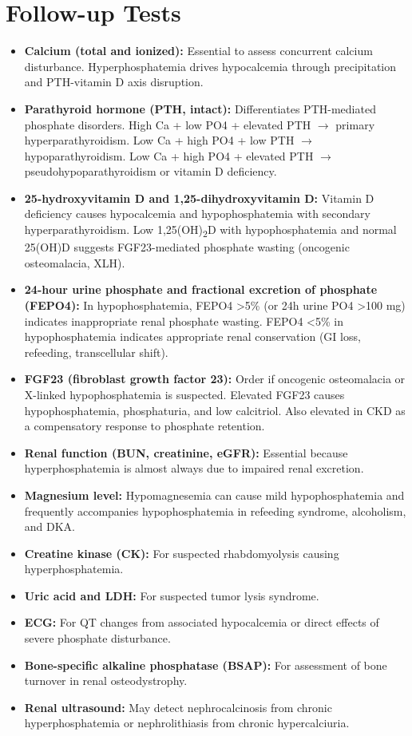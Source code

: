 \section*{Follow-up Tests}
\begin{itemize}
  \item \textbf{Calcium (total and ionized):} Essential to assess concurrent calcium disturbance. Hyperphosphatemia drives hypocalcemia through precipitation and PTH-vitamin D axis disruption.
  \item \textbf{Parathyroid hormone (PTH, intact):} Differentiates PTH-mediated phosphate disorders. High Ca + low PO4 + elevated PTH $\rightarrow$ primary hyperparathyroidism. Low Ca + high PO4 + low PTH $\rightarrow$ hypoparathyroidism. Low Ca + high PO4 + elevated PTH $\rightarrow$ pseudohypoparathyroidism or vitamin D deficiency.
  \item \textbf{25-hydroxyvitamin D and 1,25-dihydroxyvitamin D:} Vitamin D deficiency causes hypocalcemia and hypophosphatemia with secondary hyperparathyroidism. Low 1,25(OH)\textsubscript{2}D with hypophosphatemia and normal 25(OH)D suggests FGF23-mediated phosphate wasting (oncogenic osteomalacia, XLH).
  \item \textbf{24-hour urine phosphate and fractional excretion of phosphate (FEPO4):} In hypophosphatemia, FEPO4 >5\% (or 24h urine PO4 >100 mg) indicates inappropriate renal phosphate wasting. FEPO4 <5\% in hypophosphatemia indicates appropriate renal conservation (GI loss, refeeding, transcellular shift).
  \item \textbf{FGF23 (fibroblast growth factor 23):} Order if oncogenic osteomalacia or X-linked hypophosphatemia is suspected. Elevated FGF23 causes hypophosphatemia, phosphaturia, and low calcitriol. Also elevated in CKD as a compensatory response to phosphate retention.
  \item \textbf{Renal function (BUN, creatinine, eGFR):} Essential because hyperphosphatemia is almost always due to impaired renal excretion.
  \item \textbf{Magnesium level:} Hypomagnesemia can cause mild hypophosphatemia and frequently accompanies hypophosphatemia in refeeding syndrome, alcoholism, and DKA.
  \item \textbf{Creatine kinase (CK):} For suspected rhabdomyolysis causing hyperphosphatemia.
  \item \textbf{Uric acid and LDH:} For suspected tumor lysis syndrome.
  \item \textbf{ECG:} For QT changes from associated hypocalcemia or direct effects of severe phosphate disturbance.
  \item \textbf{Bone-specific alkaline phosphatase (BSAP):} For assessment of bone turnover in renal osteodystrophy.
  \item \textbf{Renal ultrasound:} May detect nephrocalcinosis from chronic hyperphosphatemia or nephrolithiasis from chronic hypercalciuria.
\end{itemize}

